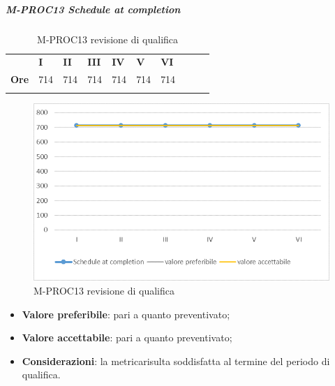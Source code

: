 \subparagraph{M-PROC13 Schedule at completion} \mbox{}
\begin{longtable}[H!] {						
		>{}p{50mm}  		
		>{}p{8mm}
		>{}p{8mm}		
		>{}p{8mm}		
		>{}p{8mm}		
		>{}p{8mm}		
		>{}p{8mm}
		>{}p{8mm}
		>{}p{8mm}
		>{}p{8mm}
	}
	\rowcolor{gray!50}
	\textbf{} & \textbf{I} & \textbf{II} & \textbf{III} & \textbf{IV} & \textbf{V} & \textbf{VI} \TBstrut \\ [2mm]
	\textbf{Ore} & 714 & 714 & 714 & 714 & 714 & 714 \TBstrut \\ [2mm]
	\rowcolor{white}
	\caption{M-PROC13 revisione di qualifica}
\end{longtable}
\begin{figure}[H] 	
	\includegraphics[width=\linewidth]{./img/grafici/RQ13.png}	
	\caption{M-PROC13 revisione di qualifica}	
\end{figure}
\begin{itemize}
	\item \textbf{Valore preferibile}: pari a quanto preventivato;
	\item \textbf{Valore accettabile}: pari a quanto preventivato;
	\item \textbf{Considerazioni}: la metrica\glosp risulta soddisfatta al termine del periodo di qualifica.
\end{itemize}

